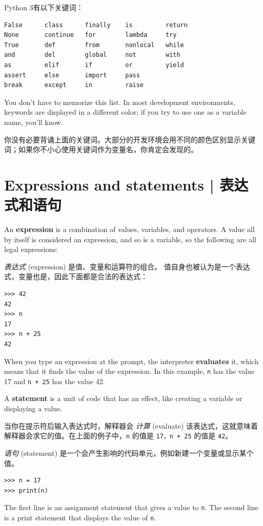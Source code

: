 Python 3有以下关键词：


\begin{lstlisting}
False      class      finally    is         return
None       continue   for        lambda     try
True       def        from       nonlocal   while
and        del        global     not        with
as         elif       if         or         yield
assert     else       import     pass
break      except     in         raise
\end{lstlisting}
%
You don't have to memorize this list.  In most development environments,
keywords are displayed in a different color; if you try to use one
as a variable name, you'll know.

你没有必要背诵上面的关键词。大部分的开发环境会用不同的颜色区别显示关键词；如果你不小心使用关键词作为变量名，你肯定会发现的。

\section{Expressions and statements  |  表达式和语句}

An {\bf expression} is a combination of values, variables, and operators.
A value all by itself is considered an expression, and so is
a variable, so the following are all legal expressions:

\emph{表达式} (expression) 是值、变量和运算符的组合。 值自身也被认为是一个表达式，变量也是，因此下面都是合法的表达式：
  

\begin{lstlisting}
>>> 42
42
>>> n
17
>>> n + 25
42
\end{lstlisting}
%
When you type an expression at the prompt, the interpreter
{\bf evaluates} it, which means that it finds the value of
the expression.
In this example, {\tt n} has the value 17 and
{\tt n + 25} has the value 42.

A {\bf statement} is a unit of code that has an effect, like
creating a variable or displaying a value.

当你在提示符后输入表达式时，解释器会 \emph{计算} (evaluate) 该表达式，这就意味着解释器会求它的值。在上面的例子中，\lstinline{n} 的值是 \lstinline{17，n + 25} 的值是 \lstinline{42}。

\emph{语句} (statement) 是一个会产生影响的代码单元，例如新建一个变量或显示某个值。

\begin{lstlisting}
>>> n = 17
>>> print(n)
\end{lstlisting}
%
The first line is an assignment statement that gives a value to
{\tt n}.  The second line is a print statement that displays the
value of {\tt n}.

